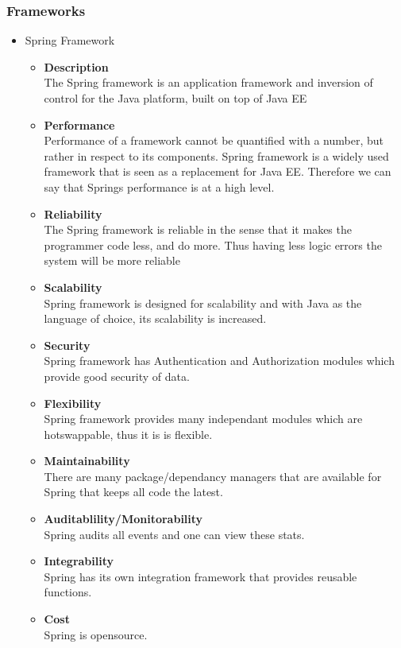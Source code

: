 \documentclass[a4paper,10pt]{article}
\begin{document}
\subsubsection{Frameworks}
	\begin{itemize}
		\item Spring Framework
			\begin{itemize}
				\item \textbf{Description}\\
					The Spring framework is an application framework and inversion of control for the Java platform, built on top of Java EE
				\item \textbf{Performance}\\
					Performance of a framework cannot be quantified with a number, but rather in respect to its components. Spring framework is a widely used framework that is seen as a replacement for Java EE. Therefore we can say that Springs performance is at a high level.
				\item \textbf{Reliability}\\
					The Spring framework is reliable in the sense that it makes the programmer code less, and do more. Thus having less logic errors the system will be more reliable
				\item \textbf{Scalability}\\
					Spring framework is designed for scalability and with Java as the language of choice, its scalability is increased.
				\item \textbf{Security}\\
					Spring framework has Authentication and Authorization modules which provide good security of data.
				\item \textbf{Flexibility}\\
					Spring framework provides many independant modules which are hotswappable, thus it is is flexible.
				\item \textbf{Maintainability}\\
					There are many package/dependancy managers that are available for Spring that keeps all code the latest.
				\item \textbf{Auditablility/Monitorability}\\		
					Spring audits all events and one can view these stats.
				\item \textbf{Integrability}\\
					Spring has its own integration framework that provides reusable functions.
				\item \textbf{Cost}\\
					Spring is opensource.
			\end{itemize}
			

\end{itemize}
\end{document}
